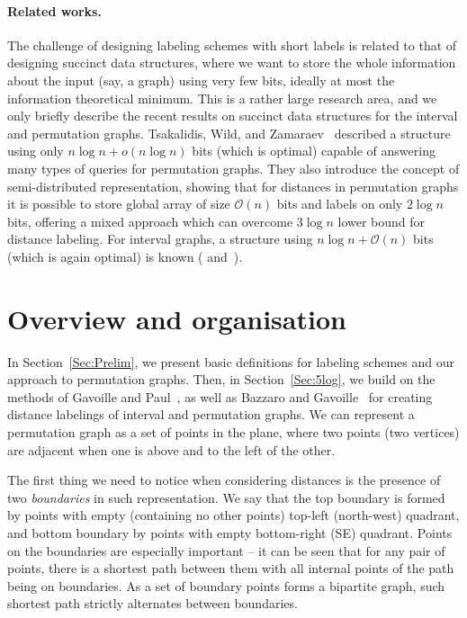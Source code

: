 \documentclass[a4paper,11pt]{article}
\newcommand{\Oh}{\mathcal{O}}
\begin{document}
\paragraph{Related works.}
The challenge of designing labeling schemes with short labels is related to that of designing succinct data structures,
where we want to store the whole information about the input (say, a graph) using very few bits, ideally at most the information
theoretical minimum. This is a rather large research area, and we only briefly describe the recent results on succinct data structures
for the interval and permutation graphs.
Tsakalidis, Wild, and Zamaraev~\cite{TsakalidisWZ23} described a structure using only $n\log{n}+o(n\log{n})$ bits (which is optimal)
capable of answering many types of queries for permutation graphs.
They also introduce the concept of semi-distributed representation, showing that for distances in permutation graphs
it is possible to store global array of size $\Oh(n)$ bits and labels on only $2\log{n}$ bits,
offering a mixed approach which can overcome $3\log{n}$ lower bound for distance labeling.
For interval graphs, a structure using $n\log{n}+\Oh(n)$ bits (which is again optimal) is known (\cite{AcanCJS21} and~\cite{HMNWW20}).

\section{Overview and organisation}

In Section~\ref{Sec:Prelim}, we present basic definitions for labeling schemes and our approach to permutation graphs.
Then, in  Section~\ref{Sec:5log}, we build on the methods of Gavoille and Paul~\cite{GavInterval}, as well as
Bazzaro and Gavoille~\cite{BazzaroG05} for creating distance labelings of interval and permutation graphs.
We can represent a permutation graph as a set of points in the plane, where two points (two vertices) are adjacent when
one is above and to the left of the other.

The first thing we need to notice when considering distances is the presence of two \emph{boundaries} in such representation.
We say that the top boundary is formed by points with empty (containing no other points) top-left (north-west) quadrant,
and bottom boundary by points with empty bottom-right (SE) quadrant.
Points on the boundaries are especially important -- it can be seen that for any pair of points, there is a shortest path between them with
all internal points of the path being on boundaries.
As a set of boundary points forms a bipartite graph, such shortest path strictly alternates between boundaries.
\end{document}
